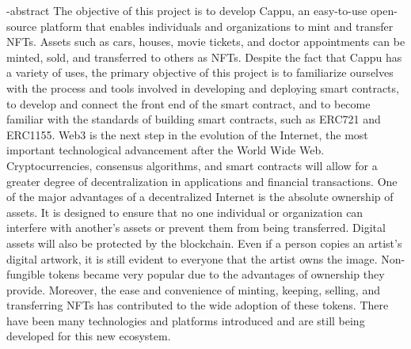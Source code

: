 
\en-abstract{
  The objective of this project is to develop Cappu, an easy-to-use open-source platform that enables individuals and organizations to mint and transfer NFTs.
  Assets such as cars, houses, movie tickets, and doctor appointments can be minted, sold, and transferred to others as NFTs.\newline \indent
  Despite the fact that Cappu has a variety of uses, the primary objective of this project is to familiarize ourselves with the process and tools involved in developing and deploying smart contracts, to develop and connect the front end of the smart contract, and to become familiar with the standards of building smart contracts, such as ERC721 and ERC1155.\newline \indent
  Web3 is the next step in the evolution of the Internet, the most important technological advancement after the World Wide Web.
  Cryptocurrencies, consensus algorithms, and smart contracts will allow for a greater degree of decentralization in applications and financial transactions.\newline \indent
  One of the major advantages of a decentralized Internet is the absolute ownership of assets.
  It is designed to ensure that no one individual or organization can interfere with another's assets or prevent them from being transferred.
  Digital assets will also be protected by the blockchain.
  Even if a person copies an artist's digital artwork, it is still evident to everyone that the artist owns the image.\newline \indent
  Non-fungible tokens became very popular due to the advantages of ownership they provide.
  Moreover, the ease and convenience of minting, keeping, selling, and transferring NFTs has contributed to the wide adoption of these tokens.
  There have been many technologies and platforms introduced and are still being developed for this new ecosystem.\newline \indent
}

